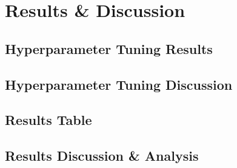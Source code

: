 \documentclass[../main.tex]{subfiles}
\begin{document}
\section{Results \& Discussion}
\noindent  

\subsection{Hyperparameter
Tuning Results}

\subsection{Hyperparameter Tuning Discussion }


\subsection{Results Table}


\subsection{Results
Discussion \& Analysis}
\end{document}
